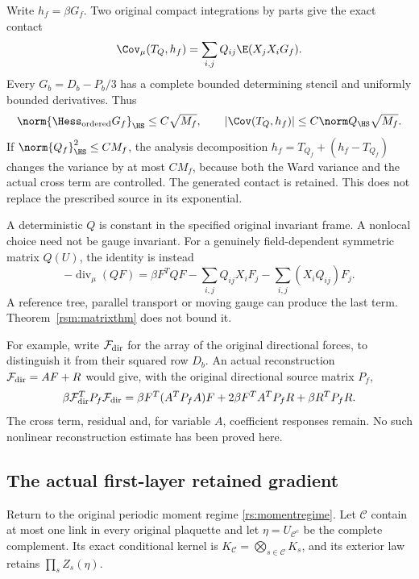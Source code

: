 Write \(h_f=\beta G_f\). Two original compact integrations by parts give the exact contact
\begin{equation}
 \Cov_\mu(T_Q,h_f)
 =\sum_{i,j}Q_{ij}\E(X_jX_iG_f).
 \label{rsm:matrixcontact}
\end{equation}
Every \(G_b=D_b-P_b/3\) has a complete bounded determining stencil and uniformly bounded derivatives. Thus
\[
 \norm{\Hess_{\rm ordered}G_f}_{\HS}\le C\sqrt{M_f},
 \qquad
 |\Cov(T_Q,h_f)|\le C\norm Q_{\HS}\sqrt{M_f}.
\]
If \(\norm{Q_f}_{\HS}^2\le CM_f\), the analysis decomposition
\(h_f=T_{Q_f}+(h_f-T_{Q_f})\) changes the variance by at most \(CM_f\), because both the Ward variance and the actual cross term are controlled. The generated contact is retained. This does not replace the prescribed source in its exponential.

A deterministic \(Q\) is constant in the specified original invariant frame. A nonlocal choice need not be gauge invariant. For a genuinely field-dependent symmetric matrix \(Q(U)\), the identity is instead
\begin{equation}
 -\operatorname{div}_\mu(QF)
 =\beta F^TQF
  -\sum_{i,j}Q_{ij}X_iF_j
  -\sum_{i,j}(X_iQ_{ij})F_j.
 \label{rsm:movingmatrix}
\end{equation}
A reference tree, parallel transport or moving gauge can produce the last term. Theorem~\ref{rsm:matrixthm} does not bound it.

For example, write \(\mathcal F_{\rm dir}\) for the array of the original directional forces, to distinguish it from their squared row \(D_b\). An actual reconstruction \(\mathcal F_{\rm dir}=AF+R\) would give, with the original directional source matrix \(P_f\),
\[
 \beta\mathcal F_{\rm dir}^TP_f\mathcal F_{\rm dir}
 =\beta F^T(A^TP_fA)F
       +2\beta F^TA^TP_fR+\beta R^TP_fR.
\]
The cross term, residual and, for variable \(A\), coefficient responses remain. No such nonlinear reconstruction estimate has been proved here.

\subsection{The actual first-layer retained gradient}

Return to the original periodic moment regime \eqref{rs:momentregime}. Let \(\mathcal C\) contain at most one link in every original plaquette and let \(\eta=U_{\mathcal C^c}\) be the complete complement. Its exact conditional kernel is \(K_{\mathcal C}=\bigotimes_{s\in\mathcal C}K_s\), and its exterior law retains \(\prod_sZ_s(\eta)\).

